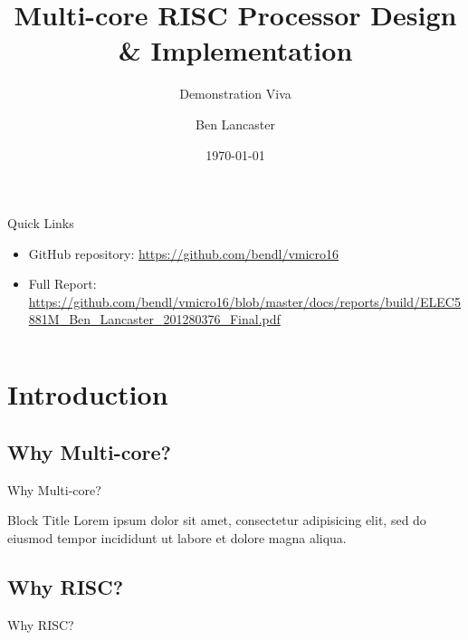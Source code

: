 \documentclass[aspectratio=169]{beamer}
\title
    [Main Project]
    {\textbf{Multi-core RISC Processor Design \& Implementation}}
\subtitle{Demonstration Viva}
\author
    [B. Lancaster]
    {Ben Lancaster}
\institute
    [\hypersetup{urlcolor=jdgrey}%
     \href{https://bendl.me/}{https://bendl.me}
    ]
    {201280376\\
    ELEC5881M - Main Project}
\date
    [12/2016]
    {\today}
\begin{document}
\begin{frame}[plain]
\titlepage
\end{frame}

\begin{frame}{Quick Links}
\begin{itemize}
    \item GitHub repository: \url{https://github.com/bendl/vmicro16}
    \item Full Report: \url{https://github.com/bendl/vmicro16/blob/master/docs/reports/build/ELEC5881M_Ben_Lancaster_201280376_Final.pdf}
\end{itemize}
\end{frame}

\begin{frame}
\vspace{-1cm}
\begin{columns}[t]
        \begin{column}{.5\textwidth}
            \tableofcontents[sections={1-3}]
        \end{column}
        \begin{column}{.5\textwidth}
            \tableofcontents[sections={4-5}]
        \end{column}
    \end{columns}
\end{frame}

\section{Introduction}
\frame{\tableofcontents[currentsection, subsectionstyle=show/show/hide]}

\subsection{Why Multi-core?}
\begin{frame}{Why Multi-core?}
\begin{alertblock}{Block Title}
Lorem ipsum dolor sit amet, consectetur adipisicing elit, 
sed do eiusmod tempor incididunt ut labore et 
dolore magna aliqua.
\end{alertblock}
\end{frame}

\subsection{Why RISC?}
\begin{frame}{Why RISC?}
\end{frame}
\end{document}
